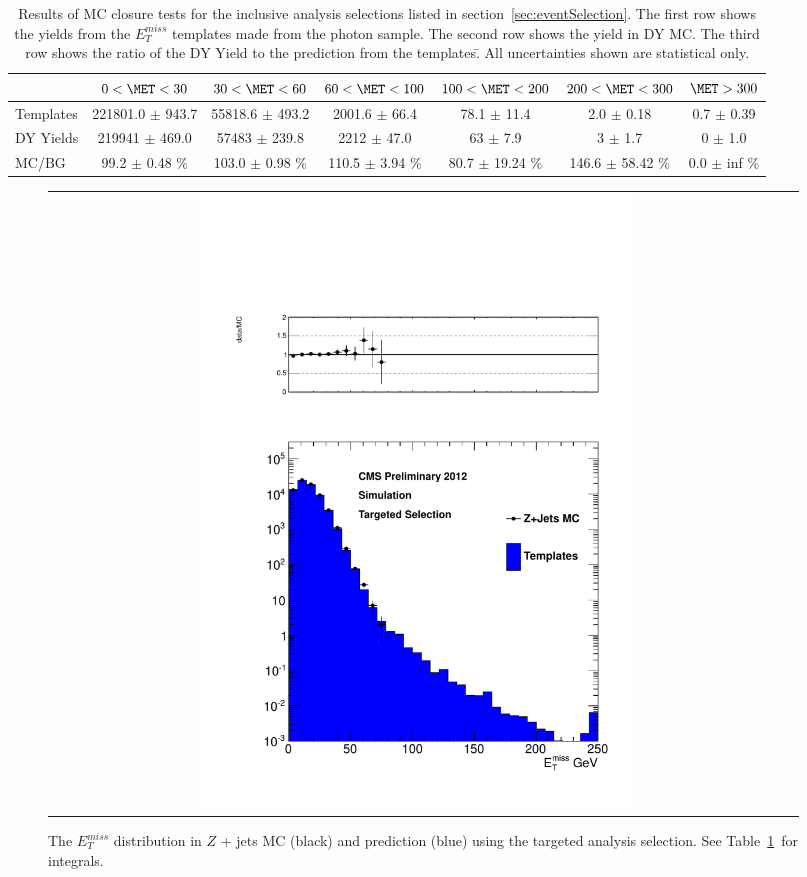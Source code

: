 \begin{table}[htb]
\scriptsize
\begin{center}
\caption{\label{table:inclusive} Results of MC closure tests for the inclusive analysis selections listed in section~\ref{sec:eventSelection}. The first row shows the yields from the $E^{miss}_T$ templates made from the photon sample. The second row shows the yield in DY MC. The third row shows the ratio of the DY Yield to the prediction from the templates.̄ All uncertainties shown are statistical only. }
\begin{tabular}{l|c|c|c|c|c|c}
\hline
\hline
          & $0 < \MET < 30$  & $30 < \MET < 60$  & $60 < \MET < 100$  & $100 < \MET < 200$  & $200 < \MET < 300$  &    $\MET > 300$  \\ 
\hline
Templates & 221801.0 $\pm$ 943.7 & 55818.6 $\pm$ 493.2 & 2001.6 $\pm$ 66.4 & 78.1 $\pm$ 11.4 &   2.0 $\pm$ 0.18 &   0.7 $\pm$ 0.39 \\
DY Yields & 219941 $\pm$ 469.0 & 57483 $\pm$ 239.8 &  2212 $\pm$ 47.0 &     63 $\pm$ 7.9 &      3 $\pm$ 1.7 &      0 $\pm$ 1.0 \\
    MC/BG & 99.2 $\pm$ 0.48 \% & 103.0 $\pm$ 0.98 \% & 110.5 $\pm$ 3.94 \% & 80.7 $\pm$ 19.24 \% & 146.6 $\pm$ 58.42 \% & 0.0 $\pm$ inf \% \\
\hline
\hline
\end{tabular}
\end{center}
\end{table}

\begin{figure}[!h]
\begin{center}
\begin{tabular}{cc}
\includegraphics[width=0.6\textwidth]{plots/closure_targeted.pdf}
\end{tabular}
\caption{The $E^{miss}_T$ distribution in $Z$ + jets MC (black) and prediction (blue) using the targeted analysis selection. See Table~\ref{table:inclusive}~for integrals.
\label{fig:targetedclosure}
}
\end{center}
\end{figure}


